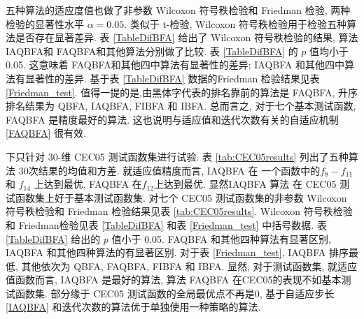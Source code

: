 五种算法的适应度值也做了非参数 Wilcoxon 符号秩检验和 Friedman 检验, 两种检验的显著性水平 $\alpha=0.05$. 类似于 t-检验, Wilcoxon 符号秩检验用于检验五种算法是否存在显著差异. 表 \ref{TableDifBFA} 给出了 Wilcoxon 符号秩检验的结果, 算法 IAQBFA和 FAQBFA和其他算法分别做了比较. 表 \ref{TableDifBFA} 的 $p$ 值均小于 0.05. 这意味着 FAQBFA和其他四中算法有显著性的差异; IAQBFA 和其他四中算法有显著性的差异. 基于表 \ref{TableDifBFA} 数据的Friedman 检验结果见表 \ref{Friedman_test}. 值得一提的是,由黑体字代表的排名靠前的算法是 FAQBFA, 升序排名结果为 QBFA, IAQBFA, FIBFA 和 IBFA. 总而言之, 对于七个基本测试函数, FAQBFA 是精度最好的算法. 这也说明与适应值和迭代次数有关的自适应机制 \eqref{FAQBFA} 很有效.

下只针对 30-维 CEC05 测试函数集进行试验. 表 \ref{tab:CEC05results} 列出了五种算法 30次结果的均值和方差. 就适应值精度而言, IAQBFA 在 一个函数中的$f_8-f_{11}$和 $f_{14}$ 上达到最优, FAQBFA 在$f_{12}$上达到最优. 显然IAQBFA 算法 在 CEC05 测试函数集上好于基本测试函数集. 对七个 CEC05 测试函数集的非参数 Wilcoxon 符号秩检验和 Friedman 检验结果见表 \ref{tab:CEC05results}. Wilcoxon 符号秩检验和 Friedman检验见表 \ref{TableDifBFA} 和表 \ref{Friedman_test} 中括号数据. 表 \ref{TableDifBFA} 给出的 $p$ 值小于 0.05. FAQBFA 和其他四种算法有显著区别, IAQBFA 和其他四种算法的有显著区别. 对于表 \ref{Friedman_test}, IAQBFA 排序最低, 其他依次为 QBFA, FAQBFA, FIBFA 和 IBFA. 显然, 对于测试函数集, 就适应值函数而言, IAQBFA 是最好的算法, 算法 FAQBFA 在CEC05的表现不如基本测试函数集. 部分缘于 CEC05 测试函数的全局最优点不再是0, 基于自适应步长 \eqref{IAQBFA} 和迭代次数的算法优于单独使用一种策略的算法.
\onecolumn
\vspace{0.5em}
